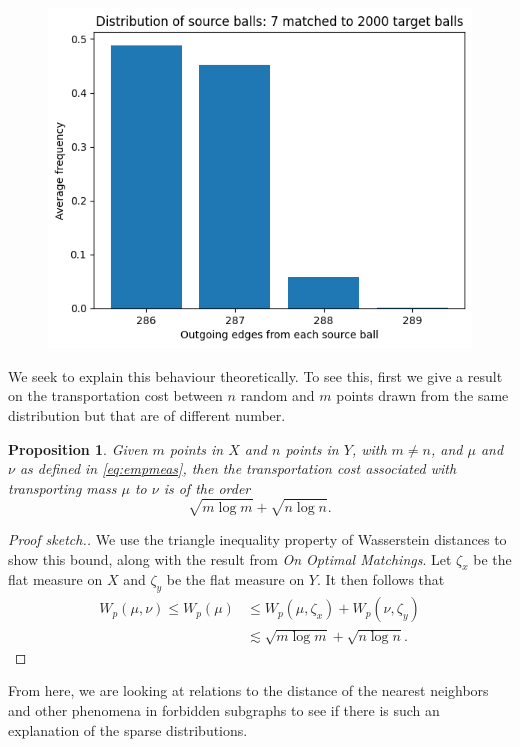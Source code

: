 \documentclass[12pt]{article}%
\theoremstyle{plain}
\newtheorem{proposition}{Proposition}
\begin{document}
\begin{figure}
  \centering
  \hspace*{0cm}\includegraphics[width=1\textwidth,height=\textwidth,keepaspectratio]{images/7-2000.png}
  \caption{}
  \label{fig: B}
\end{figure}

We seek to explain this behaviour theoretically. To see this, first we give a result on the transportation cost between $n$ random and $m$ points drawn from the same distribution but that are of different number.
\begin{proposition}
  Given $m$ points in $X$ and $n$ points in $Y$, with $m \neq n$, and $\mu$ and $\nu$ as defined in \ref{eq:empmeas}, then the transportation cost associated with transporting mass $\mu$ to $\nu$ is of the order
  \[
    \sqrt{m\log m} + \sqrt{n\log n}.
  \]
\end{proposition}
\begin{proof}[Proof sketch.]
  We use the triangle inequality property of Wasserstein distances to show this bound, along with the result from \textit{On Optimal Matchings}. Let $\zeta_x$ be the flat measure on $X$ and $\zeta_y$ be the flat measure on $Y$. It then follows that
  \begin{align*}
    W_p (\mu, \nu) \leq W_p (\mu) &\leq W_p (\mu, \zeta_x) + W_p (\nu, \zeta_y)\\
    &\lesssim \sqrt{m\log m} + \sqrt{n\log n}.
  \end{align*}
\end{proof}
From here, we are looking at relations to the distance of the nearest neighbors and other phenomena in forbidden subgraphs to see if there is such an explanation of the sparse distributions.
\end{document}
